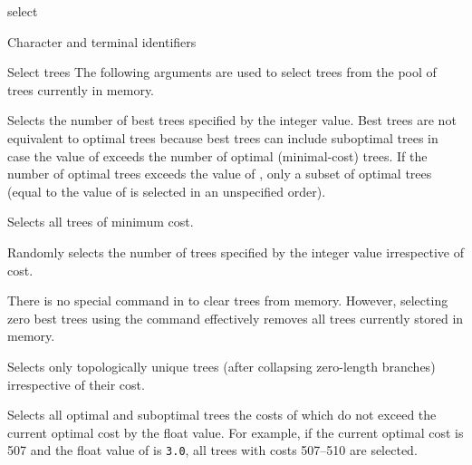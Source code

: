 \begin{command}{select}{}
\begin{arguments}
\begin{argumentgroup}{Character and terminal identifiers}
        \end{argumentgroup}

        \begin{argumentgroup}{Select trees}
            {The following arguments are used to select trees from the pool of trees currently in memory.}

                {Selects the number of best trees specified by the integer value.
                Best trees are not equivalent to optimal trees because best trees
                can include suboptimal trees in case the value of
                 exceeds the number of optimal (minimal-cost)
                trees. If the number of optimal trees exceeds the value of
                , only a subset of optimal trees (equal to the
                value of  is selected in an unspecified order).} 
                 {}

                {Selects all trees of minimum cost.} 
                {}
            
                {Randomly selects the number of trees specified by the integer
                value irrespective of cost.} 
                {}

            \begin{statement}
               There is no special command in \poy to clear trees from memory. However,
               selecting zero best trees using the command 
               effectively removes all trees currently stored in memory.
            \end{statement}
            
                {Selects only topologically unique trees (after collapsing zero-length
                branches) irrespective of their cost.} 
                {}

                {Selects all optimal and suboptimal trees the costs of which do not exceed
                the current optimal cost by the float value. For example, if the current
                optimal cost is 507 and the float value of  is
                \texttt{3.0}, all trees with costs 507--510 are selected.} 
                {}

        \end{argumentgroup}
    

\end{arguments}
\end{command}
